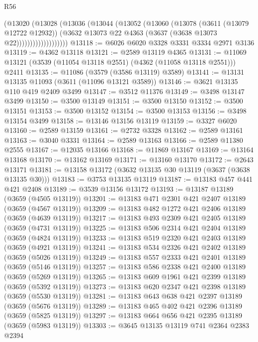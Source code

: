 \begin{lexlean}{R56}
\begin{coremodule}
                      (@13020
                        (@13028
                          (@13036
                            (@13044
                              (@13052
                                (@13060
                                  (@13078
                                    (@3611 (@13079 @12722 @12932))
                                    (@3632
                                      @13073
                                      @22
                                      @4363
                                      (@3637 (@3638 @13073 @22)))))))))))))))))))
@13118 := @6026 @6020 @3328 @3331 @3334 @2971 @3136
@13119 := @4362 @13118
@13121 := @2589 @13119 @4365
@13131 := @11069 @13121 (@3539 (@11054 @13118 @2551) (@4362 (@11058 @13118 @2551))) @2411
@13135 := @11086 (@3579 (@3586 @13119) @3589)
@13141 := @13131 @13135 @11093 (@3611 (@11096 @13121 @3589))
@13146 := @3621 @13135 @110 @419 @2409 @3499
@13147 := @3512 @11376
@13149 := @3498 @13147 @3499
@13150 := @3500 @13149
@13151 := @3500 @13150
@13152 := @3500 @13151
@13153 := @3500 @13152
@13154 := @3500 @13153
@13156 := @3498 @13154 @3499
@13158 := @13146 @13156 @13119
@13159 := @3327 @6020
@13160 := @2589 @13159
@13161 := @2732 @3328
@13162 := @2589 @13161
@13163 := @3040 @3331
@13164 := @2589 @13163
@13166 := @2589 @11380 @2555
@13167 := @12035 @13166
@13168 := @11869 @13167
@13169 := @13164 @13168
@13170 := @13162 @13169
@13171 := @13160 @13170
@13172 := @2643 @13171
@13181 := @13158 @13172 (@3632 @13135 @30 @13119 (@3637 (@3638 @13135 @30)))
@13183 := @3753 @13135 @13119
@13187 := @13183 @457 @441 @421 @2408
@13189 := @3539 @13156 @13172
@13193 := @13187 @13189 (@3659 (@4505 @13119))
@13201 := @13183 @471 @2301 @421 @2407 @13189 (@3659 (@4567 @13119))
@13209 := @13183 @482 @1272 @421 @2406 @13189 (@3659 (@4639 @13119))
@13217 := @13183 @493 @2309 @421 @2405 @13189 (@3659 (@4731 @13119))
@13225 := @13183 @506 @2314 @421 @2404 @13189 (@3659 (@4824 @13119))
@13233 := @13183 @519 @2320 @421 @2403 @13189 (@3659 (@4921 @13119))
@13241 := @13183 @534 @2326 @421 @2402 @13189 (@3659 (@5026 @13119))
@13249 := @13183 @557 @2333 @421 @2401 @13189 (@3659 (@5146 @13119))
@13257 := @13183 @586 @2338 @421 @2400 @13189 (@3659 (@5269 @13119))
@13265 := @13183 @609 @1961 @421 @2399 @13189 (@3659 (@5392 @13119))
@13273 := @13183 @620 @2347 @421 @2398 @13189 (@3659 (@5530 @13119))
@13281 := @13183 @643 @638 @421 @2397 @13189 (@3659 (@5676 @13119))
@13289 := @13183 @465 @402 @421 @2396 @13189 (@3659 (@5825 @13119))
@13297 := @13183 @664 @656 @421 @2395 @13189 (@3659 (@5983 @13119))
@13303 := @3645 @13135 @13119 @741 @2364 @2383 @2394

\end{coremodule}
\end{lexlean}
